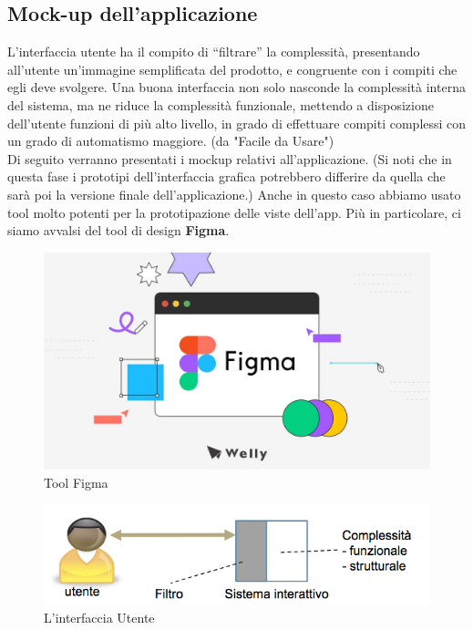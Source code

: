 \subsection{Mock-up dell'applicazione}
    \begin{flushleft}
       
        L'interfaccia utente  ha il compito di “filtrare” la complessità, presentando all'utente un'immagine semplificata del prodotto, e congruente con i compiti che egli deve
        svolgere. Una buona interfaccia non solo nasconde la complessità interna del sistema, ma ne riduce la
        complessità funzionale, mettendo a disposizione dell'utente funzioni di più alto livello, in grado di effettuare compiti
        complessi con un grado di automatismo maggiore. (da "Facile da Usare")\\
        Di seguito verranno presentati i mockup relativi all'applicazione. (Si noti che in questa fase i prototipi dell'interfaccia grafica potrebbero differire da quella che sarà poi la versione finale dell'applicazione.)
        Anche in questo caso abbiamo usato tool molto potenti per la prototipazione delle viste dell'app. Più in particolare, ci siamo avvalsi del tool di design \textbf{Figma}.
        
        \begin{figure}[H]
          \centering
          \includegraphics[scale=0.5]{assets/immagini varie/figma.jpg}
          \caption{Tool Figma}\label{fig:figma}
        \end{figure}

        \vspace{2cm}
         \begin{figure}[H]
          \centering
          \includegraphics[scale=0.7]{assets/immagini varie/interfaccia utente.png}
          \caption{L'interfaccia Utente}\label{fig:interfaccia utente}
        \end{figure}

    \end{flushleft}

